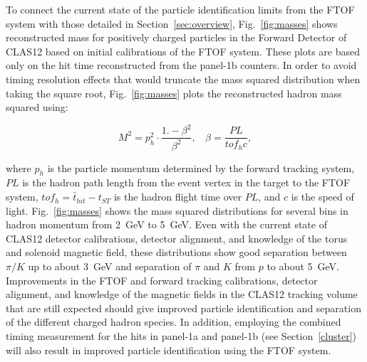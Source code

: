 \documentclass{elsart}
\begin{document}
To connect the current state of the particle identification limits from the FTOF system with those
detailed in Section~\ref{sec:overview}, Fig.~\ref{fig:masses} shows reconstructed mass for positively
charged particles in the Forward Detector of CLAS12 based on initial calibrations of the FTOF system.
These plots are based only on the hit time reconstructed from the panel-1b counters. In order to avoid
timing resolution effects that would truncate the mass squared distribution when taking the square root,
Fig.~\ref{fig:masses} plots the reconstructed hadron mass squared using:

\begin{equation}
M^2 = p_h^2 \cdot \frac{1.-\beta^2}{\beta^2},~~~~\beta=\frac{PL}{tof_h c},
\end{equation}

\noindent
where $p_h$ is the particle momentum determined by the forward tracking system, $PL$ is the hadron
path length from the event vertex in the target to the FTOF system, $tof_h= \bar{t}_{hit} - t_{ST}$ is
the hadron flight time over $PL$, and $c$ is the speed of light. Fig.~\ref{fig:masses} shows the mass
squared distributions for several bins in hadron momentum from 2~GeV to 5~GeV. Even with the current
state of CLAS12 detector calibrations, detector alignment, and knowledge of the torus and solenoid
magnetic field, these distributions show good separation between $\pi/K$ up to about 3~GeV and
separation of $\pi$ and $K$ from $p$ to about 5~GeV. Improvements in the FTOF and forward tracking
calibrations, detector alignment, and knowledge of the magnetic fields in the CLAS12 tracking volume
that are still expected should give improved particle identification and separation of the different
charged hadron species. In addition, employing the combined timing measurement for the hits in panel-1a
and panel-1b (see Section~\ref{cluster}) will also result in improved particle identification using the
FTOF system.
\end{document}
